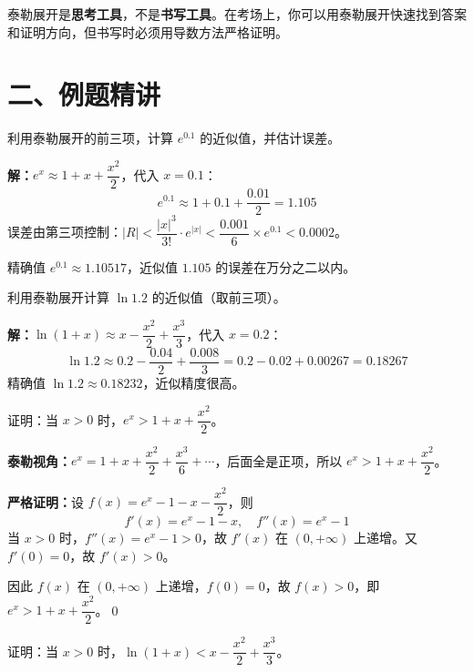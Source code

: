 \documentclass[12pt, a4paper]{ctexart}
\begin{document}
\begin{warnbox}[考场策略]
泰勒展开是\textbf{思考工具}，不是\textbf{书写工具}。在考场上，你可以用泰勒展开快速找到答案和证明方向，但书写时必须用导数方法严格证明。
\end{warnbox}

\section*{\textcolor{examorange}{二、例题精讲}}

\begin{examplebox}[【例题1】泰勒展开求近似值]
利用泰勒展开的前三项，计算 $e^{0.1}$ 的近似值，并估计误差。
\end{examplebox}

\textbf{解：}$e^x \approx 1 + x + \dfrac{x^2}{2}$，代入 $x = 0.1$：
\[
e^{0.1} \approx 1 + 0.1 + \frac{0.01}{2} = 1.105
\]
误差由第三项控制：$|R| < \dfrac{|x|^3}{3!} \cdot e^{|x|} < \dfrac{0.001}{6} \times e^{0.1} < 0.0002$。

精确值 $e^{0.1} \approx 1.10517$，近似值 $1.105$ 的误差在万分之二以内。

\begin{examplebox}[【例题2】泰勒展开求近似值]
利用泰勒展开计算 $\ln 1.2$ 的近似值（取前三项）。
\end{examplebox}

\textbf{解：}$\ln(1+x) \approx x - \dfrac{x^2}{2} + \dfrac{x^3}{3}$，代入 $x = 0.2$：
\[
\ln 1.2 \approx 0.2 - \frac{0.04}{2} + \frac{0.008}{3} = 0.2 - 0.02 + 0.00267 = 0.18267
\]
精确值 $\ln 1.2 \approx 0.18232$，近似精度很高。

\begin{examplebox}
证明：当 $x > 0$ 时，$e^x > 1 + x + \dfrac{x^2}{2}$。
\end{examplebox}

\textbf{泰勒视角：}$e^x = 1 + x + \dfrac{x^2}{2} + \dfrac{x^3}{6} + \cdots$，后面全是正项，所以 $e^x > 1 + x + \dfrac{x^2}{2}$。

\textbf{严格证明：}设 $f(x) = e^x - 1 - x - \dfrac{x^2}{2}$，则
\[
f'(x) = e^x - 1 - x, \quad f''(x) = e^x - 1
\]
当 $x > 0$ 时，$f''(x) = e^x - 1 > 0$，故 $f'(x)$ 在 $(0, +\infty)$ 上递增。又 $f'(0) = 0$，故 $f'(x) > 0$。

因此 $f(x)$ 在 $(0, +\infty)$ 上递增，$f(0) = 0$，故 $f(x) > 0$，即 $e^x > 1 + x + \dfrac{x^2}{2}$。\qed

\begin{examplebox}[【例题4】放缩证明]
证明：当 $x > 0$ 时，$\ln(1+x) < x - \dfrac{x^2}{2} + \dfrac{x^3}{3}$。
\end{examplebox}
\end{document}
